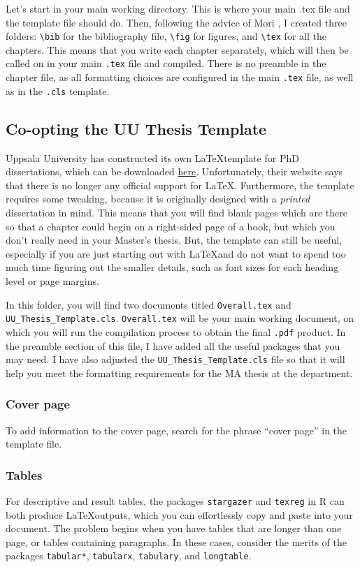 \documentclass[12pt, letterpaper]{article}
\begin{document}
Let's start in your main working directory. This is where your main .tex file and the template file should do. Then, following the advice of Mori \autocite*{mori2007writing}, I created three folders: \verb|\bib| for the bibliography file, \verb|\fig| for figures, and \verb|\tex| for all the chapters. This means that you write each chapter separately, which will then be called on in your main \verb|.tex| file and compiled. There is no preamble in the chapter file, as all formatting choices are configured in the main \verb|.tex| file, as well as in the \verb|.cls| template.

\subsection{Co-opting the UU Thesis Template}
Uppsala University has constructed its own \LaTeX template for PhD dissertations, which can be downloaded \href{https://libguides.ub.uu.se/Thesis/Template_LaTeX}{here}. Unfortunately, their website says that there is no longer any official support for \LaTeX. Furthermore, the template requires some tweaking, because it is originally designed with a \emph{printed} dissertation in mind. This means that you will find blank pages which are there so that a chapter could begin on a right-sided page of a book, but which you don't really need in your Master's thesis. But, the template can still be useful, especially if you are just starting out with \LaTeX and do not want to spend too much time figuring out the smaller details, such as font sizes for each heading level or page margins. 

In this folder, you will find two documents titled \verb|Overall.tex| and \verb|UU_Thesis_Template.cls|. \verb|Overall.tex| will be your main working document, on which you will run the compilation process to obtain the final \verb|.pdf| product. In the preamble section of this file, I have added all the useful packages that you may need. I have also adjusted the \verb|UU_Thesis_Template.cls| file so that it will help you meet the formatting requirements for the MA thesis at the department.

\subsubsection{Cover page}
To add information to the cover page, search for the phrase ``cover page'' in the template file.

\subsubsection{Tables}
For descriptive and result tables, the packages \verb|stargazer| and \verb|texreg| in \textsf{R} can both produce \LaTeX outputs, which you can effortlessly copy and paste into your document. The problem begins when you have tables that are longer than one page, or tables containing paragraphs. In these cases, consider the merits of the packages \verb|tabular*|, \verb|tabularx|, \verb|tabulary|, and \verb|longtable|. 
\end{document}
